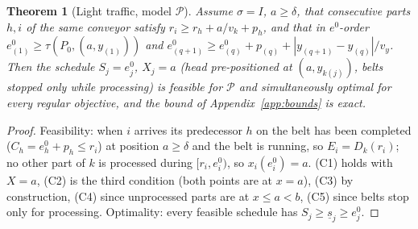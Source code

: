 \documentclass[11pt,a4paper]{article}
\theoremstyle{plain}
\newtheorem{theorem}{Theorem}
\theoremstyle{definition}
\theoremstyle{remark}
\newcommand{\Pb}{\mathcal{P}}
\begin{document}
\begin{theorem}[Light traffic, model $\Pb$]\label{thm:LTP}
Assume $\sigma=I$, $a\ge\delta$, that consecutive parts $h,i$ of the same conveyor satisfy
$r_i\ge r_h+a/v_k+p_h$, and that in $e^0$-order $e^0_{(1)}\ge\tau(P_0,(a,y_{(1)}))$ and
$e^0_{(q+1)}\ge e^0_{(q)}+p_{(q)}+|y_{(q+1)}-y_{(q)}|/v_y$. Then the schedule $S_j=e^0_j$,
$X_j=a$ (head pre-positioned at $(a,y_{k(j)})$, belts stopped only while processing) is
feasible for $\Pb$ and simultaneously optimal for every regular objective, and the bound
of Appendix~\ref{app:bounds} is exact.
\end{theorem}
\begin{proof}
Feasibility: when $i$ arrives its predecessor $h$ on the belt has been completed
($C_h=e^0_h+p_h\le r_i$) at position $a\ge\delta$ and the belt is running, so
$E_i=D_k(r_i)$; no other part of $k$ is processed during $[r_i,e^0_i)$, so $x_i(e^0_i)=a$.
(C1) holds with $X=a$, (C2) is the third condition (both points are at $x=a$), (C3) by
construction, (C4) since unprocessed parts are at $x\le a<b$, (C5) since belts stop only
for processing. Optimality: every feasible schedule has $S_j\ge\underline s_j\ge e^0_j$.
\end{proof}
\end{document}
